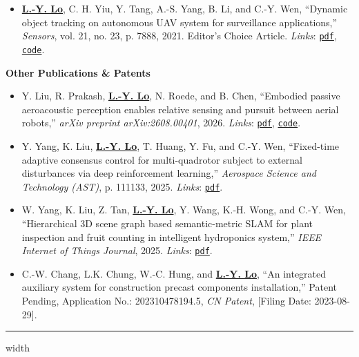 \documentclass[overlapped]{res}
\newcommand{\pink}[1]{\textcolor{pink!40!red}{#1}} %
\begin{document}
\begin{resume}
\begin{itemize}
  \item \underline{\textbf{L.-Y. Lo}}, C. H. Yiu, Y. Tang, A.-S. Yang, B. Li, and C.-Y. Wen, ``Dynamic object tracking on autonomous UAV system for surveillance applications,'' \textit{Sensors}, vol. 21, no. 23, p. 7888, 2021. Editor's Choice Article. \textit{Links}: \pink{\texttt{\href{https://pattylo.github.io/pdfs/auto.pdf}{pdf}}}, \pink{\texttt{\href{https://github.com/HKPolyU-UAV/auto}{code}}}.
\end{itemize}
\textbf{Other Publications \& Patents}
\begin{itemize}
  \item Y. Liu, R. Prakash, \underline{\textbf{L.-Y. Lo}}, N. Roede, and B. Chen, ``Embodied passive aeroacoustic perception enables relative sensing and pursuit between aerial robots,'' \textit{arXiv preprint arXiv:2608.00401}, 2026. \textit{Links}: \pink{\texttt{\href{https://pattylo.github.io/pdfs/sonicfly.pdf}{pdf}}}, \pink{\texttt{\href{https://github.com/generalroboticslab/SonicFly}{code}}}.
  \item Y. Yang, K. Liu, \underline{\textbf{L.-Y. Lo}}, T. Huang, Y. Fu, and C.-Y. Wen, “Fixed-time adaptive consensus control for multi-quadrotor subject to external disturbances via deep reinforcement learning,” \textit{Aerospace Science and Technology (AST)}, p. 111133, 2025. \textit{Links}: \pink{\texttt{\href{https://pattylo.github.io/pdfs/swarm_rl.pdf}{pdf}}}.
  \item W. Yang, K. Liu, Z. Tan, \underline{\textbf{L.-Y. Lo}}, Y. Wang, K.-H. Wong, and C.-Y. Wen, “Hierarchical 3D scene graph based semantic-metric SLAM for plant inspection and fruit counting in intelligent hydroponics system,” \textit{IEEE Internet of Things Journal}, 2025. \textit{Links}: \pink{\texttt{\href{https://pattylo.github.io/pdfs/scene_graph.pdf}{pdf}}}.
  
  \item C.-W. Chang, L.K. Chung, W.-C. Hung, and \underline{\textbf{L.-Y. Lo}}, ``An integrated auxiliary system for construction precast components installation,'' Patent Pending, Application No.: 202310478194.5, \textit{CN Patent}, [Filing Date: 2023-08-29].
  
\end{itemize}

\par\noindent\hrule width \linewidth %

\end{resume}
\end{document}
